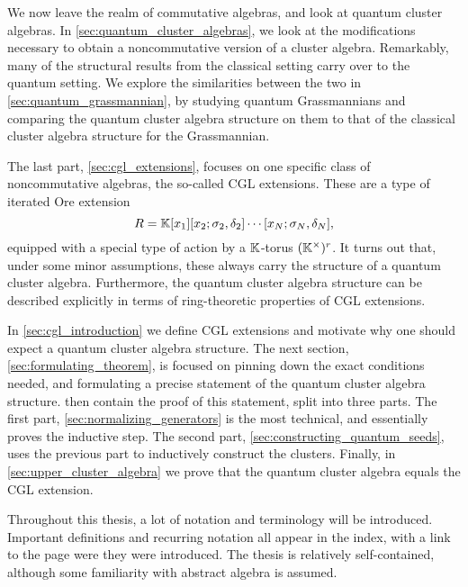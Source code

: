 \medskip

We now leave the realm of commutative algebras, and look at quantum cluster algebras.
In \cref{sec:quantum_cluster_algebras}, we look at the modifications necessary to
obtain a noncommutative version of a cluster algebra. Remarkably, many of the
structural results from the classical setting carry over to the quantum setting. We
explore the similarities between the two in \cref{sec:quantum_grassmannian}, by
studying quantum Grassmannians and comparing the quantum cluster algebra structure on
them to that of the classical cluster algebra structure for the Grassmannian.

\medskip

The last part, \cref{sec:cgl_extensions}, focuses on one specific class of
noncommutative algebras, the so-called CGL extensions. These are a type of iterated Ore
extension
\begin{equation*}
	R = \mathbb{K}[x_1][x_2; \sigma_2, \delta_2]\cdots[x_N; \sigma_N, \delta_N],
\end{equation*}
%
equipped with a special type of action by a $\mathbb{K}$-torus $(\mathbb{K}^\times)^r$. It turns
out that, under some minor assumptions, these always carry the structure of a quantum
cluster algebra. Furthermore, the quantum cluster algebra structure can be described
explicitly in terms of ring-theoretic properties of CGL extensions.

In \cref{sec:cgl_introduction} we define CGL extensions and motivate why one should
expect a quantum cluster algebra structure. The next section,
\cref{sec:formulating_theorem}, is focused on pinning down the exact conditions needed,
and formulating a precise statement of the quantum cluster algebra structure.
then contain the proof of this statement, split into three parts. The first part,
\cref{sec:normalizing_generators} is the most technical, and essentially proves the
inductive step. The second part, \cref{sec:constructing_quantum_seeds}, uses the
previous part to inductively construct the clusters. Finally, in
\cref{sec:upper_cluster_algebra} we prove that the quantum cluster algebra equals the
CGL extension.

\medskip

Throughout this thesis, a lot of notation and terminology will be introduced. Important
definitions and recurring notation all appear in the index, with a link to the page
were they were introduced. The thesis is relatively self-contained, although some
familiarity with abstract algebra is assumed.


